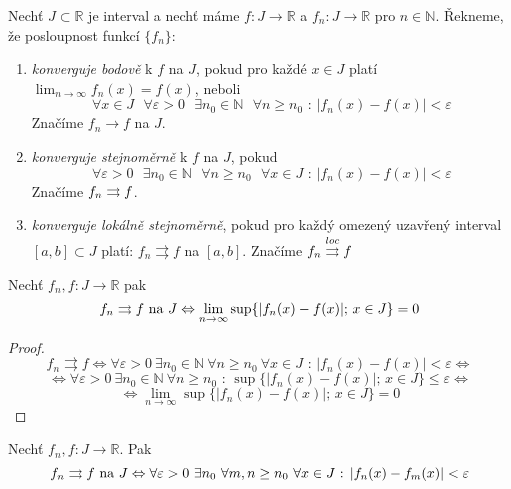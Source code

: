 \begin{definice}
Nechť $J \subset \mathbb{R}$ je interval a nechť máme $f : J \rightarrow \mathbb{R}$ a $f_n : J \rightarrow \mathbb{R}$ pro $n \in \mathbb{N}$. Řekneme, že posloupnost funkcí $\{f_n\}$:

\begin{enumerate}
\item \emph{konverguje bodově} k $f$ na $J$, pokud pro každé $x \in J$ platí $\lim_{n \rightarrow \infty} f_n(x) = f(x)$, neboli
$$\forall x \in J \textrm{ } \forall \varepsilon > 0 \textrm{ } \exists n_0 \in \mathbb{N} \textrm{ } \forall n \geq n_0 \textrm{ : } |f_n(x) - f(x)| < \varepsilon$$
Značíme $f_n \rightarrow f$ na $J$.
\item \emph{konverguje stejnoměrně} k $f$ na $J$, pokud
$$\forall \varepsilon > 0 \textrm{ } \exists n_0 \in \mathbb{N} \textrm{ } \forall n \geq n_0 \textrm{ } \forall x \in J \textrm{ : } | f_n(x) - f(x) | < \varepsilon$$
Značíme $f_n \rightrightarrows f$.
\item \emph{konverguje lokálně stejnoměrně}, pokud pro každý omezený uzavřený interval $[a, b] \subset J$ platí: $f_n \rightrightarrows f$ na $[a, b]$. Značíme $f_n \overset{loc}{\rightrightarrows} f$
\end{enumerate}
\end{definice}

\begin{vetal}
Nechť $f_n, f:J \rightarrow \mathbb{R}$ pak
$$f_n \rightrightarrows f \textrm{ na } J \Leftrightarrow \lim_{n \rightarrow \infty} \sup \{ |f_n(x) - f(x)| \textrm{; } x \in J \} = 0$$
\end{vetal}

\begin{proof}
$$ f_n \rightrightarrows f \Leftrightarrow \forall \varepsilon > 0 \  \exists n_0 \in \mathbb{N} \  \forall n \geq n_0 \  \forall x \in J \textrm{ : } |f_n(x) - f(x)| < \varepsilon \Leftrightarrow$$
$$\Leftrightarrow \forall \varepsilon > 0 \  \exists n_0 \in \mathbb{N} \  \forall n \geq n_0 \textrm{ : } \sup \{ |f_n(x) - f(x) | \textrm{; } x \in J \} \leq \varepsilon \Leftrightarrow$$
$$\Leftrightarrow \lim_{n \to \infty} \sup\{|f_n(x)-f(x)| \textrm{; } x \in J\} = 0$$
\end{proof}

\begin{vetat}
Nechť $f_n,f : J \rightarrow \mathbb{R}$. Pak
$$f_n \rightrightarrows f \textrm{ na } J \Leftrightarrow \forall \varepsilon > 0 \  \exists n_0 \  \forall m,n \geq n_0 \  \forall x \in J \textrm{ : } | f_n(x) - f_m(x)| < \varepsilon$$
\end{vetat}

